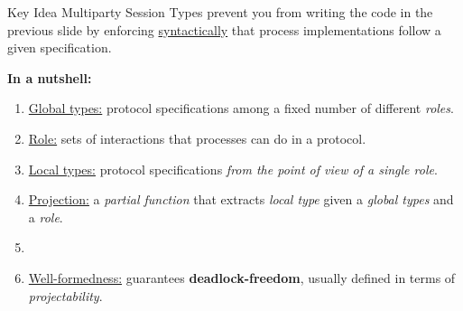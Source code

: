 \begin{frame}[fragile]{Key Idea}
  Multiparty Session Types prevent you from writing the code in the previous
  slide by enforcing \underline{syntactically} that process implementations
  follow a given specification.

  \vspace{1cm}
  \textbf{In a nutshell:}
  \begin{enumerate}
    \item \underline{Global types:} protocol specifications among a fixed number of different \emph{roles}.
    \item \underline{Role:} sets of interactions that processes can do in a protocol.
    \item \underline{Local types:} protocol specifications \emph{from the point of view of a single role}.
    \item \underline{Projection:} a \emph{partial function} that extracts
      \emph{local type} given a \emph{global types} and a \emph{role}.
    \item[]
    \item \underline{Well-formedness:} guarantees \textbf{deadlock-freedom},
      usually defined in terms of \emph{projectability}.
  \end{enumerate}
\end{frame}

